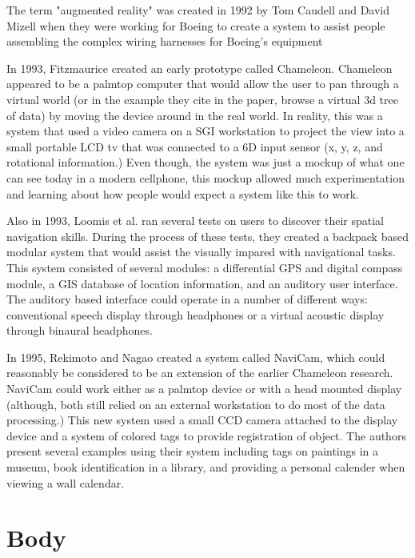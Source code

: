 \documentclass{acm_proc_article-sp}
\begin{document}
The term "augmented reality" was created in 1992 by Tom Caudell and David Mizell when they were working for Boeing to create a system to assist people assembling the complex wiring harnesses for Boeing's equipment \cite{citeulike:6081386} \cite{carmigniani2011augmented}

In 1993, Fitzmaurice created an early prototype called Chameleon.\cite{fitzmaurice1993situated} 
Chameleon appeared to be a palmtop computer that would allow the user to pan through a virtual world (or in the example they cite in the paper, browse a virtual 3d tree of data) by moving the device around in the real world.  In reality, this was a system that used a video camera on a SGI workstation to project the view into a small portable LCD tv that was connected to a 6D input sensor (x, y, z, and rotational information.)  Even though, the system was just a mockup of what one can see today in a modern cellphone, this mockup allowed much experimentation and learning about how people would expect a system like this to work.

Also in 1993, Loomis et al. ran several tests on users to discover their spatial navigation skills.  \cite{loomis1993nonvisual} During the process of these tests, they created a backpack based modular system that would assist the visually impared with navigational tasks.  This system consisted of several modules: a differential GPS and digital compass module, a GIS database of location information, and an auditory user interface.  The auditory based interface could operate in a number of different ways: conventional speech display through headphones or a virtual acoustic display through binaural headphones. \cite{loomis1994personal}

In 1995, Rekimoto and Nagao created a system called NaviCam, which could reasonably be considered to be an extension of the earlier Chameleon research. \cite{fitzmaurice1993situated}  NaviCam could work either as a palmtop device or with a head mounted display (although, both still relied on an external workstation to do most of the data processing.)  This new system used a small CCD camera attached to the display device and a system of colored tags to provide registration of object.  The authors present several examples using their system including tags on paintings in a museum, book identification in a library, and providing a personal calender when viewing a wall calendar. \cite{rekimoto1995world}
\section{Body}
\end{document}
